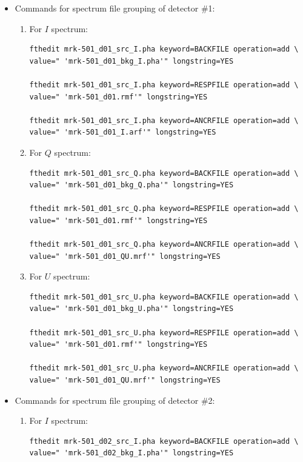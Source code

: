 \begin{itemize}
        \item Commands for spectrum file grouping of detector \#1:
        \begin{enumerate}
        	\item For $I$ spectrum:
        	\begin{verbatim}
fthedit mrk-501_d01_src_I.pha keyword=BACKFILE operation=add \
value=" 'mrk-501_d01_bkg_I.pha'" longstring=YES

fthedit mrk-501_d01_src_I.pha keyword=RESPFILE operation=add \
value=" 'mrk-501_d01.rmf'" longstring=YES

fthedit mrk-501_d01_src_I.pha keyword=ANCRFILE operation=add \
value=" 'mrk-501_d01_I.arf'" longstring=YES
        	\end{verbatim}
        	
        	\item For $Q$ spectrum:
        	\begin{verbatim}
fthedit mrk-501_d01_src_Q.pha keyword=BACKFILE operation=add \
value=" 'mrk-501_d01_bkg_Q.pha'" longstring=YES

fthedit mrk-501_d01_src_Q.pha keyword=RESPFILE operation=add \
value=" 'mrk-501_d01.rmf'" longstring=YES

fthedit mrk-501_d01_src_Q.pha keyword=ANCRFILE operation=add \
value=" 'mrk-501_d01_QU.mrf'" longstring=YES
        	\end{verbatim}
        	
        	\item For $U$ spectrum:
        	\begin{verbatim}
fthedit mrk-501_d01_src_U.pha keyword=BACKFILE operation=add \
value=" 'mrk-501_d01_bkg_U.pha'" longstring=YES

fthedit mrk-501_d01_src_U.pha keyword=RESPFILE operation=add \
value=" 'mrk-501_d01.rmf'" longstring=YES

fthedit mrk-501_d01_src_U.pha keyword=ANCRFILE operation=add \
value=" 'mrk-501_d01_QU.mrf'" longstring=YES
        	\end{verbatim}
        \end{enumerate}
        
        \item Commands for spectrum file grouping of detector \#2:
        \begin{enumerate}
        	\item For $I$ spectrum:
        	\begin{verbatim}
fthedit mrk-501_d02_src_I.pha keyword=BACKFILE operation=add \
value=" 'mrk-501_d02_bkg_I.pha'" longstring=YES


\end{verbatim}
\end{enumerate}
\end{itemize}
